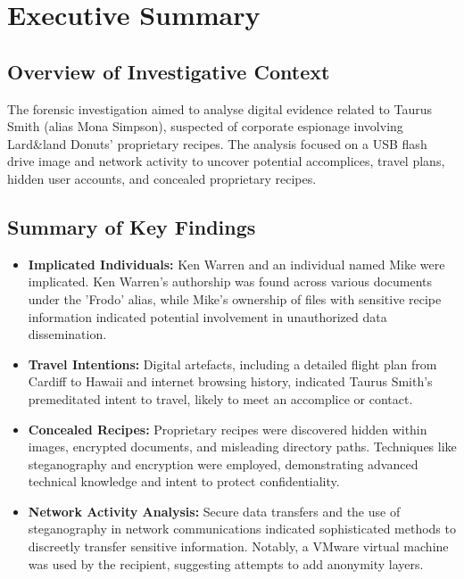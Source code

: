 
\chapter*{Executive Summary}

\section*{Overview of Investigative Context}

The forensic investigation aimed to analyse digital evidence related to Taurus Smith (alias Mona Simpson), suspected of corporate espionage involving Lard\&land Donuts' proprietary recipes. The analysis focused on a USB flash drive image and network activity to uncover potential accomplices, travel plans, hidden user accounts, and concealed proprietary recipes.

\section*{Summary of Key Findings}

\begin{itemize}
    \item \textbf{Implicated Individuals:} Ken Warren and an individual named Mike were implicated. Ken Warren's authorship was found across various documents under the 'Frodo' alias, while Mike's ownership of files with sensitive recipe information indicated potential involvement in unauthorized data dissemination.
    
    \item \textbf{Travel Intentions:} Digital artefacts, including a detailed flight plan from Cardiff to Hawaii and internet browsing history, indicated Taurus Smith's premeditated intent to travel, likely to meet an accomplice or contact.
    
    \item \textbf{Concealed Recipes:} Proprietary recipes were discovered hidden within images, encrypted documents, and misleading directory paths. Techniques like steganography and encryption were employed, demonstrating advanced technical knowledge and intent to protect confidentiality.
    
    \item \textbf{Network Activity Analysis:} Secure data transfers and the use of steganography in network communications indicated sophisticated methods to discreetly transfer sensitive information. Notably, a VMware virtual machine was used by the recipient, suggesting attempts to add anonymity layers.
\end{itemize}


